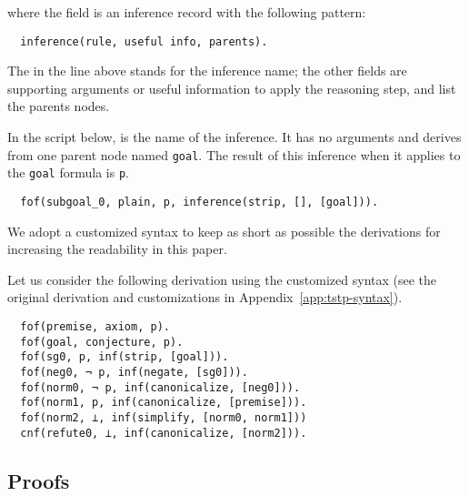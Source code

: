 \documentclass[../main.tex]{subfiles}
\begin{document}
where the  field is an inference record with the following
pattern:

\begin{verbatim}
  inference(rule, useful info, parents).
\end{verbatim}

The  in the line above stands for the inference name;
the other fields are supporting arguments or useful information to
apply the reasoning step, and list the parents nodes.

\begin{myexamplenum}

In the script below, \strip is the name of the inference.
It has no arguments and derives from one parent node named  \verb!goal!. The
result of this inference when it applies to the \verb!goal! formula is
\verb!p!.

\begin{verbatim}
  fof(subgoal_0, plain, p, inference(strip, [], [goal])).
\end{verbatim}
\end{myexamplenum}

\begin{notation}

We adopt a customized \TSTP syntax to keep as short as possible the \Metis
derivations for increasing the readability in this paper.

\begin{myexamplenum}
\label{fig:metis-example-tree}

Let us consider the following \TSTP derivation using
the customized \TSTP syntax (see the original \TSTP derivation and customizations in Appendix~\ref{app:tstp-syntax}).

\begin{verbatim}
  fof(premise, axiom, p).
  fof(goal, conjecture, p).
  fof(sg0, p, inf(strip, [goal])).
  fof(neg0, ¬ p, inf(negate, [sg0])).
  fof(norm0, ¬ p, inf(canonicalize, [neg0])).
  fof(norm1, p, inf(canonicalize, [premise])).
  fof(norm2, ⊥, inf(simplify, [norm0, norm1]))
  cnf(refute0, ⊥, inf(canonicalize, [norm2])).
\end{verbatim}

\end{myexamplenum}
\end{notation}


\subsection{Proofs}
\label{ssec:metis-proofs}
\end{document}
